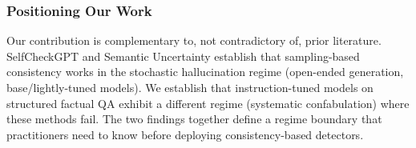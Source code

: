 \subsubsection{Positioning Our Work}

Our contribution is complementary to, not contradictory of, prior literature. SelfCheckGPT and Semantic Uncertainty establish that sampling-based consistency works in the stochastic hallucination regime (open-ended generation, base/lightly-tuned models). We establish that instruction-tuned models on structured factual QA exhibit a different regime (systematic confabulation) where these methods fail. The two findings together define a regime boundary that practitioners need to know before deploying consistency-based detectors.

